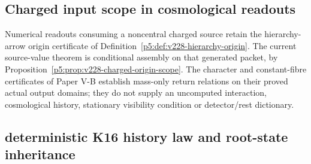 \documentclass[12pt,a4paper]{article}
\begin{document}
\subsection{Charged input scope in cosmological readouts}
\label{p6b:sec:v228-charged-source-scope}
Numerical readouts consuming a noncentral charged source retain the
hierarchy-arrow origin certificate of
Definition~\ref{p5:def:v228-hierarchy-origin}.
The current source-value theorem is conditional assembly on that generated
packet, by Proposition~\ref{p5:prop:v228-charged-origin-scope}.
The character and constant-fibre certificates of Paper V-B establish
mass-only return relations on their proved actual output domains;
they do not supply an uncomputed interaction, cosmological history,
stationary visibility condition or detector/rest dictionary.


\subsection{deterministic K16 history law and root-state inheritance}
\label{p9:sec:v187-k16-history-state}
\end{document}
